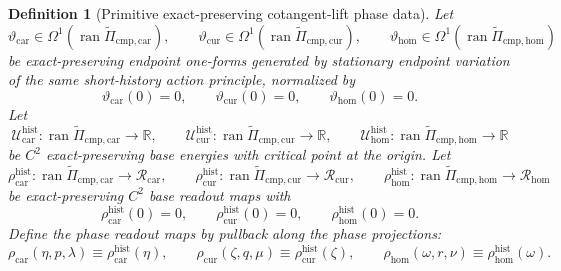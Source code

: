 \documentclass[11pt]{article}
\newcommand{\TensorEqCmpProj}{\widetilde\Pi_{\mathrm{cmp,car}}}
\newcommand{\CurEqCmpProj}{\widetilde\Pi_{\mathrm{cmp,cur}}}
\newcommand{\HomEqCmpProj}{\widetilde\Pi_{\mathrm{cmp,hom}}}
\newcommand{\TensorPhaseReadClass}{\mathscr R_{\mathrm{car}}}
\newcommand{\CurPhaseReadClass}{\mathscr R_{\mathrm{cur}}}
\newcommand{\HomPhaseReadClass}{\mathscr R_{\mathrm{hom}}}
\newcommand{\TensorPhaseRead}{\rho_{\mathrm{car}}}
\newcommand{\CurPhaseRead}{\rho_{\mathrm{cur}}}
\newcommand{\HomPhaseRead}{\rho_{\mathrm{hom}}}
\newtheorem{definition}{Definition}
\begin{document}
\begin{definition}[Primitive exact-preserving cotangent-lift phase data]
Let
\[
\vartheta_{\mathrm{car}}\in\Omega^1(\operatorname{ran}\TensorEqCmpProj),\qquad
\vartheta_{\mathrm{cur}}\in\Omega^1(\operatorname{ran}\CurEqCmpProj),\qquad
\vartheta_{\mathrm{hom}}\in\Omega^1(\operatorname{ran}\HomEqCmpProj)
\]
be exact-preserving endpoint one-forms generated by stationary endpoint variation of the same short-history action principle, normalized by
\[
\vartheta_{\mathrm{car}}(0)=0,\qquad
\vartheta_{\mathrm{cur}}(0)=0,\qquad
\vartheta_{\mathrm{hom}}(0)=0.
\]
Let
\[
\mathcal U_{\mathrm{car}}^{\mathrm{hist}}:\operatorname{ran}\TensorEqCmpProj\to\mathbb R,\qquad
\mathcal U_{\mathrm{cur}}^{\mathrm{hist}}:\operatorname{ran}\CurEqCmpProj\to\mathbb R,\qquad
\mathcal U_{\mathrm{hom}}^{\mathrm{hist}}:\operatorname{ran}\HomEqCmpProj\to\mathbb R
\]
be \(C^2\) exact-preserving base energies with critical point at the origin. Let
\[
\rho_{\mathrm{car}}^{\mathrm{hist}}:\operatorname{ran}\TensorEqCmpProj\to\TensorPhaseReadClass,\qquad
\rho_{\mathrm{cur}}^{\mathrm{hist}}:\operatorname{ran}\CurEqCmpProj\to\CurPhaseReadClass,\qquad
\rho_{\mathrm{hom}}^{\mathrm{hist}}:\operatorname{ran}\HomEqCmpProj\to\HomPhaseReadClass
\]
be exact-preserving \(C^2\) base readout maps with
\[
\rho_{\mathrm{car}}^{\mathrm{hist}}(0)=0,\qquad
\rho_{\mathrm{cur}}^{\mathrm{hist}}(0)=0,\qquad
\rho_{\mathrm{hom}}^{\mathrm{hist}}(0)=0.
\]
Define the phase readout maps by pullback along the phase projections:
\begin{equation}
\TensorPhaseRead(\eta,p,\lambda)\equiv\rho_{\mathrm{car}}^{\mathrm{hist}}(\eta),\qquad
\CurPhaseRead(\zeta,q,\mu)\equiv\rho_{\mathrm{cur}}^{\mathrm{hist}}(\zeta),\qquad
\HomPhaseRead(\omega,r,\nu)\equiv\rho_{\mathrm{hom}}^{\mathrm{hist}}(\omega).
\label{eq:cotangent_phase_read}
\end{equation}


\end{definition}
\end{document}
